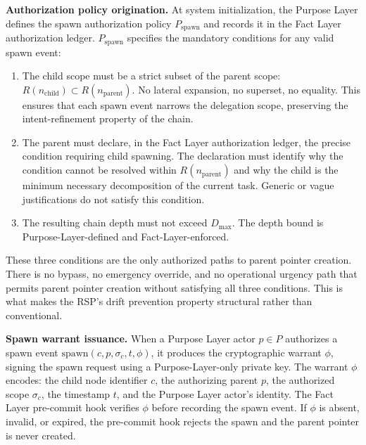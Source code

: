 \medskip
\noindent\textbf{Authorization policy origination.} At system initialization, the Purpose Layer defines the spawn authorization policy $P_{\mathrm{spawn}}$ and records it in the Fact Layer authorization ledger. $P_{\mathrm{spawn}}$ specifies the mandatory conditions for any valid spawn event:

\begin{enumerate}
    \item[(S1) \textbf{Scope refinement.}] The child scope must be a strict subset of the parent scope: $R(n_{\mathrm{child}}) \subset R(n_{\mathrm{parent}})$. No lateral expansion, no superset, no equality. This ensures that each spawn event narrows the delegation scope, preserving the intent-refinement property of the chain.

    \item[(S2) \textbf{Operational necessity.}] The parent must declare, in the Fact Layer authorization ledger, the precise condition requiring child spawning. The declaration must identify why the condition cannot be resolved within $R(n_{\mathrm{parent}})$ and why the child is the minimum necessary decomposition of the current task. Generic or vague justifications do not satisfy this condition.

    \item[(S3) \textbf{Depth within bound.}] The resulting chain depth must not exceed $D_{\max}$. The depth bound is Purpose-Layer-defined and Fact-Layer-enforced.
\end{enumerate}

These three conditions are the only authorized paths to parent pointer creation. There is no bypass, no emergency override, and no operational urgency path that permits parent pointer creation without satisfying all three conditions. This is what makes the RSP's drift prevention property structural rather than conventional.

\medskip
\noindent\textbf{Spawn warrant issuance.} When a Purpose Layer actor $p \in P$ authorizes a spawn event $\mathrm{spawn}(c, p, \sigma_c, t, \phi)$, it produces the cryptographic warrant $\phi$, signing the spawn request using a Purpose-Layer-only private key. The warrant $\phi$ encodes: the child node identifier $c$, the authorizing parent $p$, the authorized scope $\sigma_c$, the timestamp $t$, and the Purpose Layer actor's identity. The Fact Layer pre-commit hook verifies $\phi$ before recording the spawn event. If $\phi$ is absent, invalid, or expired, the pre-commit hook rejects the spawn and the parent pointer is never created.

